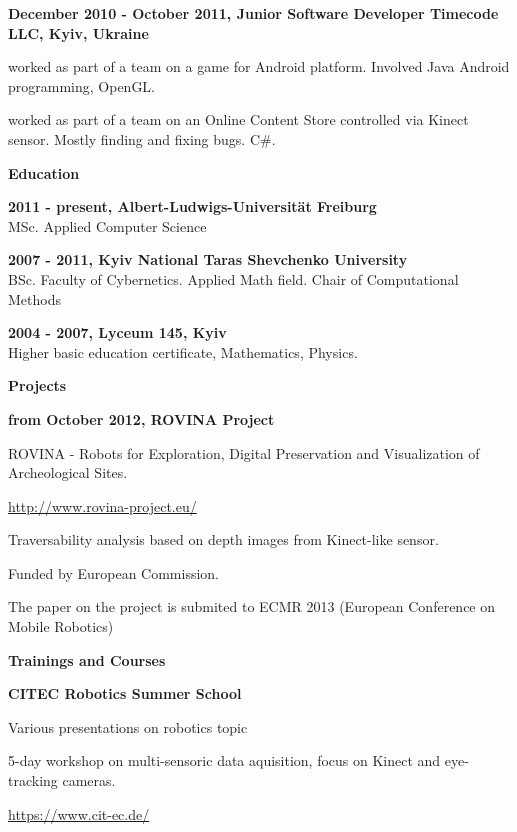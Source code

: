 \documentclass[a4paper,12pt,final]{memoir}
\newcommand{\Sep}{\vspace{1.5em}}
\newcommand{\SmallSep}{\vspace{0.5em}}
\newcommand{\CVSection}[1]
	{\Large\textbf{#1}\par
	\SmallSep\normalsize\normalfont}
\newcommand{\CVItem}[1]
	{\textbf{\color{MidnightBlue} #1}}
\begin{document}
\CVItem{December 2010 - October 2011, Junior Software Developer
\newline Timecode LLC, Kyiv, Ukraine}
\begin{compactitem}[\color{MidnightBlue}$\circ$]
\item worked as part of a team on a game for Android platform. Involved Java Android programming, OpenGL.
\item worked as part of a team on an Online Content Store controlled via Kinect sensor. Mostly finding and fixing bugs. C\#.
\end{compactitem}
\Sep

\CVSection{Education}
\CVItem{2011 - present, Albert-Ludwigs-Universität Freiburg}\\
MSc. Applied Computer Science
\SmallSep

\CVItem{2007 - 2011, Kyiv National Taras Shevchenko University}\\
BSc. Faculty of Cybernetics. Applied Math field. 
\newline Chair of Computational Methods
\SmallSep

\CVItem{2004 - 2007, Lyceum 145, Kyiv}\\
Higher basic education certificate, Mathematics, Physics.
\Sep
\framebreak
\clearpage
\framebreak
\framebreak

\CVSection{Projects}
\CVItem{from October 2012, ROVINA Project}
\begin{compactitem}[\color{MidnightBlue}$\circ$]
	\item ROVINA - Robots for Exploration, Digital Preservation and Visualization of Archeological Sites.
	\item \href{http://www.rovina-project.eu/}{http://www.rovina-project.eu/} 
	\item Traversability analysis based on depth images from Kinect-like sensor.
	\item Funded by European Commission.
	\item The paper on the project is submited to ECMR 2013 (European Conference on Mobile Robotics)
\end{compactitem}
\SmallSep

\CVSection{Trainings and Courses}
\CVItem{CITEC Robotics Summer School}
\begin{compactitem}[\color{MidnightBlue}$\circ$]
	\item Various presentations on robotics topic
	\item 5-day workshop on multi-sensoric data aquisition, focus on Kinect and eye-tracking cameras.
	\item \href{https://www.cit-ec.de/}{https://www.cit-ec.de/} 
\end{compactitem}
\SmallSep
\end{document}
